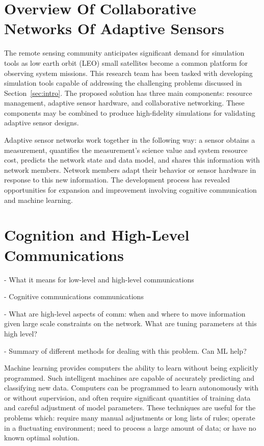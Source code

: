 \documentclass[conference]{IEEEtran}
\begin{document}

\section{Overview Of Collaborative Networks Of Adaptive Sensors}
\label{sec:overview}

The remote sensing community anticipates significant demand for simulation tools
as low earth orbit (LEO) small satellites become a common platform for observing
system missions.  This research team has been tasked with developing simulation
tools capable of addressing the challenging problems discussed in
Section~\ref{sec:intro}.  The proposed solution has three main components:
resource management, adaptive sensor hardware, and collaborative networking.
These components may be combined to produce high-fidelity simulations for
validating adaptive sensor designs.

Adaptive sensor networks work together in the following way: a sensor obtains a
measurement, quantifies the measurement's science value and system resource
cost, predicts the network state and data model, and shares this information
with network members.  Network members adapt their behavior or sensor hardware
in response to this new information.  The development process has revealed
opportunities for expansion and improvement involving cognitive communication
and machine learning.




\section{Cognition and High-Level Communications}
\label{sec:hlc}

{\color{red}
  - What it means for low-level and high-level communications

  - Cognitive communications communications

  - What are high-level aspects of comm: when and where to move information
  given large scale constraints on the network. What are tuning parameters at
  this high level?

  - Summary of different methods for dealing with this problem. Can ML help?
}

Machine learning provides computers the ability to learn without being
explicitly programmed.  Such intelligent machines are capable of accurately
predicting and classifying new data.  Computers can be programmed to learn
autonomously with or without supervision, and often require significant
quantities of training data and careful adjustment of model parameters.  These
techniques are useful for the problems which: require many manual adjustments or
long lists of rules; operate in a fluctuating environment; need to process a
large amount of data; or have no known optimal solution.
\end{document}
